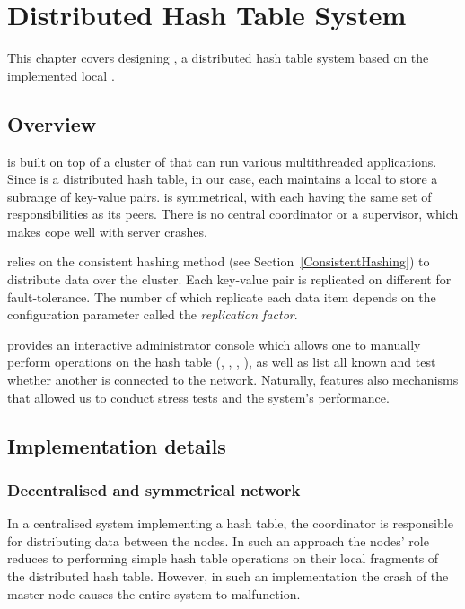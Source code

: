 \chapter{Distributed Hash Table System} \label{Distribution}

This chapter covers designing \DHTS, a distributed hash table system based on the implemented local \PHT.

\section{Overview}

    \DHTS is built on top of a cluster of \Nodes that can run various multithreaded applications. Since \DHTS is a distributed hash table, in our case, each \Node maintains a local \PHT to store a subrange of key-value pairs. \DHTS is symmetrical, with each \Node having the same set of responsibilities as its peers. There is no central coordinator or a supervisor, which makes \DHTS cope well with server crashes.

    \DHTS relies on the consistent hashing method (see Section~\ref{ConsistentHashing}) to distribute data over the cluster. Each key-value pair is replicated on different \Nodes for fault-tolerance. The number of \Nodes which replicate each data item depends on the configuration parameter called the \emph{replication factor}.

    \DHTS provides an interactive administrator console which allows one to manually perform operations on the hash table (\insertMethod, \getMethod, \removeMethod, \iterateMethod), as well as list all known \Nodes and test whether another \Node is connected to the network.
    Naturally, \DHTS features also mechanisms that allowed us to conduct stress tests and the system's performance.

\section{Implementation details}
    \subsection{Decentralised and symmetrical network}
        In a centralised system implementing a hash table, the coordinator is responsible for distributing data between the nodes. In such an approach the nodes' role reduces to performing simple hash table operations on their local fragments of the distributed hash table. However, in such an implementation the crash of the master node causes the entire system to malfunction.
        
